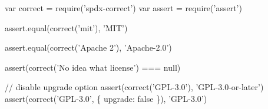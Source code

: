 
\begin{DoxyCode}
var correct = require('spdx-correct')
var assert = require('assert')

assert.equal(correct('mit'), 'MIT')

assert.equal(correct('Apache 2'), 'Apache-2.0')

assert(correct('No idea what license') === null)

// disable upgrade option
assert(correct('GPL-3.0'), 'GPL-3.0-or-later')
assert(correct('GPL-3.0', \{ upgrade: false \}), 'GPL-3.0')
\end{DoxyCode}
 